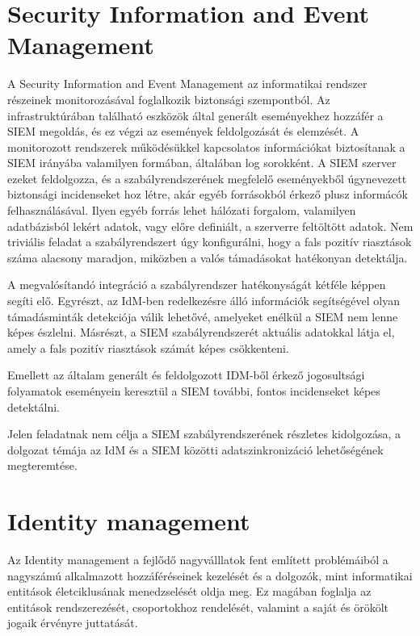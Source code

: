 \section{Security Information and Event Management}

A Security Information and Event Management az informatikai rendszer részeinek monitorozásával foglalkozik biztonsági szempontból. Az infrastruktúrában található eszközök által generált eseményekhez hozzáfér a SIEM megoldás, és ez végzi az események feldolgozását és elemzését. A monitorozott rendszerek működésükkel kapcsolatos információkat biztosítanak a SIEM irányába valamilyen formában, általában log sorokként. A SIEM szerver ezeket feldolgozza, és a szabályrendszerének megfelelő eseményekből úgynevezett biztonsági incidenseket hoz létre, akár egyéb forrásokból érkező plusz informácók felhasználásával. Ilyen egyéb forrás lehet hálózati forgalom, valamilyen adatbázisból lekért adatok, vagy előre definiált, a szerverre feltöltött adatok. 
Nem triviális feladat a szabályrendszert úgy konfigurálni, hogy a fals pozitív riasztások száma alacsony maradjon, miközben a valós támadásokat hatékonyan detektálja. 

A megvalósítandó integráció a szabályrendszer hatékonyságát kétféle képpen segíti elő. Egyrészt, az IdM-ben redelkezésre álló információk segítségével olyan támadásminták detekciója válik lehetővé, amelyeket enélkül a SIEM nem lenne képes észlelni. Másrészt, a SIEM szabályrendszerét aktuális adatokkal látja el, amely a fals pozitív riasztások számát képes csökkenteni.

Emellett az általam generált és feldolgozott IDM-ből érkező jogosultsági folyamatok eseményein keresztül a SIEM további, fontos incidenseket képes detektálni.

Jelen feladatnak nem célja a SIEM szabályrendszerének részletes kidolgozása, a dolgozat témája az IdM és a SIEM közötti adatszinkronizáció lehetőségének megteremtése.
\section{Identity management}

Az Identity management a fejlődő nagyválllatok fent említett problémáiból a nagyszámú alkalmazott hozzáféréseinek kezelését és a dolgozók, mint informatikai entitások életciklusának menedzselését oldja meg. Ez magában foglalja az entitások  rendszerezését, csoportokhoz rendelését, valamint a saját és örökölt jogaik érvényre juttatását.

